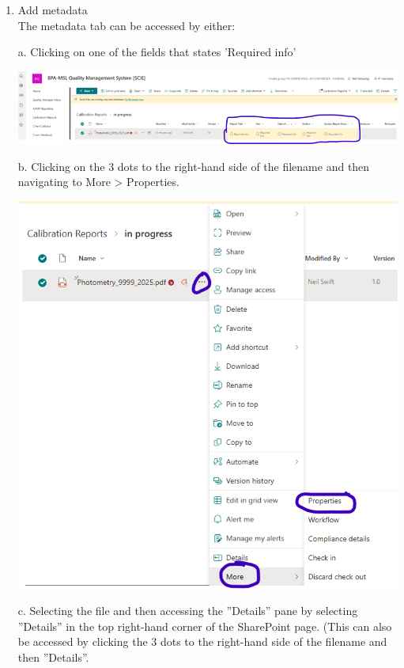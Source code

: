 \begin{enumerate}
\item Add metadata \\
The metadata tab can be accessed by either:

a.  Clicking on one of the fields that states 'Required info'

\begin{center}
\includegraphics[scale=.55]{pictures/Step3_pic1}
\end{center}

b.  Clicking on the 3 dots to the right-hand side of the filename and then navigating to More > Properties.

\begin{center}
\includegraphics[scale=.55]{pictures/Step3_pic2}
\end{center}

c.  Selecting the file and then accessing the ''Details'' pane by selecting ''Details'' in the top right-hand corner of the SharePoint page.  (This can also be accessed by clicking the 3 dots to the right-hand side of the filename and then ''Details''.


\end{enumerate}
